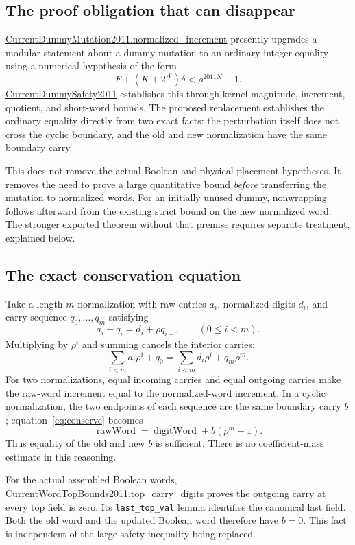 \documentclass[11pt,a4paper]{article}
\newcommand{\code}[1]{\texttt{\small #1}}
\newcommand{\repo}{https://github.com/VladimirReshetnikov/ProveIt}
\newcommand{\pin}{60fcb2a69b7f1fdd4c3592ea5f164223cad50abe}
\newcommand{\src}[2]{\href{\repo/blob/\pin/Computability/DiophantineConsistency/Lean/DiophantineConsistency/#1.lean}{#2}}
\begin{document}
\subsection{The proof obligation that can disappear}

\src{CurrentDummyMutation2011}{CurrentDummyMutation2011.normalized\_increment} presently upgrades a modular statement about a dummy mutation to an ordinary integer equality using a numerical hypothesis of the form
\[
 F+(K+2^W)\delta < \rho^{2011N}-1.
\]
\src{CurrentDummySafety2011}{CurrentDummySafety2011} establishes this through kernel-magnitude, increment, quotient, and short-word bounds. The proposed replacement establishes the ordinary equality directly from two exact facts: the perturbation itself does not cross the cyclic boundary, and the old and new normalization have the same boundary carry.

This does not remove the actual Boolean and physical-placement hypotheses. It removes the need to prove a large quantitative bound \emph{before} transferring the mutation to normalized words. For an initially unused dummy, nonwrapping follows afterward from the existing strict bound on the new normalized word. The stronger exported theorem without that premise requires separate treatment, explained below.

\subsection{The exact conservation equation}

Take a length-$m$ normalization with raw entries $a_i$, normalized digits $d_i$, and carry sequence $q_0,\ldots,q_m$ satisfying
\[
 a_i+q_i=d_i+\rho q_{i+1}\qquad(0\le i<m).
\]
Multiplying by $\rho^i$ and summing cancels the interior carries:
\begin{equation}\label{eq:conserve}
 \sum_{i<m}a_i\rho^i+q_0
 =\sum_{i<m}d_i\rho^i+q_m\rho^m.
\end{equation}
For two normalizations, equal incoming carries and equal outgoing carries make the raw-word increment equal to the normalized-word increment. In a cyclic normalization, the two endpoints of each sequence are the same boundary carry $b$; equation~\eqref{eq:conserve} becomes
\[
 \operatorname{rawWord}=\operatorname{digitWord}+b(\rho^m-1).
\]
Thus equality of the old and new $b$ is sufficient. There is no coefficient-mass estimate in this reasoning.

For the actual assembled Boolean words, \src{CurrentWordTopBounds2011}{CurrentWordTopBounds2011.top\_carry\_digits} proves the outgoing carry at every top field is zero. Its \code{last\_top\_val} lemma identifies the canonical last field. Both the old word and the updated Boolean word therefore have $b=0$. This fact is independent of the large safety inequality being replaced.
\end{document}
